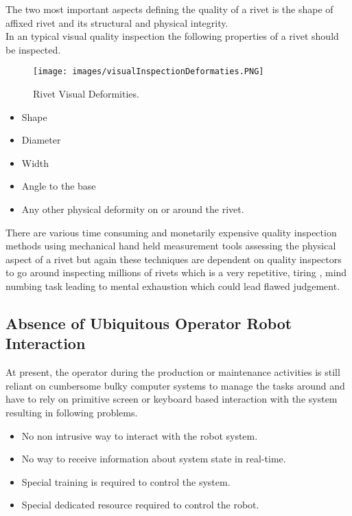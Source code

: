 \documentclass{article}
\begin{document}
The two most important aspects defining the quality of a rivet is the shape of affixed rivet and its structural and physical integrity.\\
In an typical visual quality inspection the following properties of a rivet should be inspected.

\begin{figure}[htp]
    \centering
    \texttt{[image: images/visualInspectionDeformaties.PNG]}
    \caption{Rivet Visual Deformities. \cite{airbusRivetSpecification} }
    \label{fig:Visual inspecton deformaties}
\end{figure}

    \begin{itemize}
        \item Shape
        \item Diameter
        \item Width
        \item Angle to the base
        \item Any other physical deformity on or around the rivet.
    \end{itemize}



There are various time consuming and monetarily expensive quality inspection methods using mechanical hand held measurement tools assessing the physical aspect of a rivet but again these techniques are dependent on quality inspectors to go around inspecting millions of rivets which is a very repetitive, tiring , mind numbing task leading to mental exhaustion which could lead flawed judgement.

\quad \quad \subsection{Absence of Ubiquitous Operator Robot Interaction}

At present, the operator during the production or maintenance activities is still reliant on cumbersome bulky computer systems to manage the tasks around and have to rely on primitive screen or keyboard based interaction with the system resulting in following problems.

 \begin{itemize}

        \item No non intrusive way to interact with the robot system.
        \item No way to receive information about system state in real-time.
        \item Special training is required to control the system.
        \item Special dedicated resource required to control the robot.
        
    \end{itemize}
\end{document}

